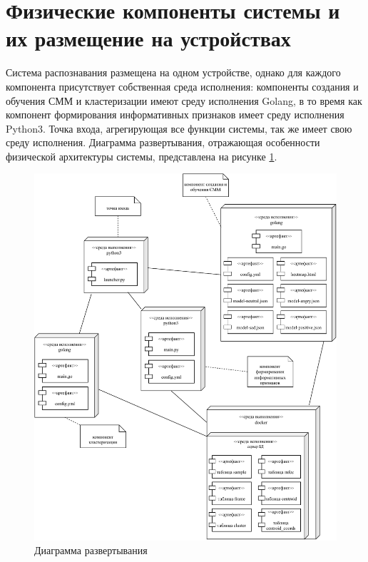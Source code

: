 \section{Физические компоненты системы и их размещение на устройствах}
Система распознавания размещена на одном устройстве, однако для каждого компонента присутствует собственная среда исполнения: компоненты создания и обучения СММ и кластеризации имеют среду исполнения Golang, в то время как компонент формирования информативных признаков имеет среду исполнения Python3.  Точка входа, агрегирующая все функции системы, так же имеет свою среду исполнения.  Диаграмма развертывания, отражающая особенности физической архитектуры системы, представлена на рисунке \ref{fig:deploy}.
\begin{figure}[H]
	\centering
	\includegraphics[width=\linewidth]{assets/deploy}
	\caption{Диаграмма развертывания}
	\label{fig:deploy}
\end{figure} 
